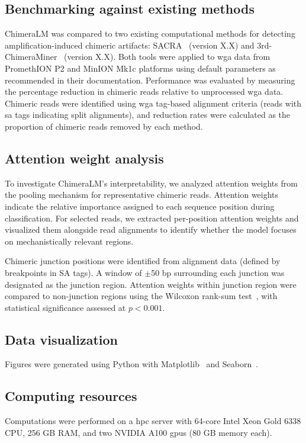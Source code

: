 \documentclass[pdflatex,sn-nature,lineno]{sn-jnl}%
\theoremstyle{thmstyleone}%
\theoremstyle{thmstyletwo}%
\theoremstyle{thmstylethree}%
\begin{document}
\subsection*{Benchmarking against existing methods}

ChimeraLM was compared to two existing computational methods for detecting amplification-induced chimeric artifacts: SACRA~\cite{kiguchi2021longread} (version X.X) and 3rd-ChimeraMiner~\cite{lu2023exploration} (version X.X).
Both tools were applied to \gls{wga} data from PromethION P2 and MinION Mk1c platforms using default parameters as recommended in their documentation.
Performance was evaluated by measuring the percentage reduction in chimeric reads relative to unprocessed \gls{wga} data.
Chimeric reads were identified using \gls{wga} tag-based alignment criteria (reads with \gls{sa} tags indicating split alignments), and reduction rates were calculated as the proportion of chimeric reads removed by each method.


\subsection*{Attention weight analysis}

To investigate ChimeraLM's interpretability, we analyzed attention weights from the pooling mechanism for representative chimeric reads.
Attention weights indicate the relative importance assigned to each sequence position during classification.
For selected reads, we extracted per-position attention weights and visualized them alongside read alignments to identify whether the model focuses on mechanistically relevant regions.

Chimeric junction positions were identified from alignment data (defined by breakpoints in SA tags).
A window of $\pm$50 bp surrounding each junction was designated as the junction region. Attention weights within junction region were compared to non-junction regions using the Wilcoxon rank-sum test~\cite{2020SciPy-NMeth}, with statistical significance assessed at $p < 0.001$.

\subsection*{Data visualization}
Figures were generated using Python with Matplotlib~\cite{Hunter2007} and Seaborn~\cite{Waskom2021}.

\subsection*{Computing resources}
Computations were performed on a \gls{hpc} server with 64-core Intel Xeon Gold 6338 CPU, 256 GB RAM, and two NVIDIA A100 \glspl{gpu} (80 GB memory each).
\end{document}

